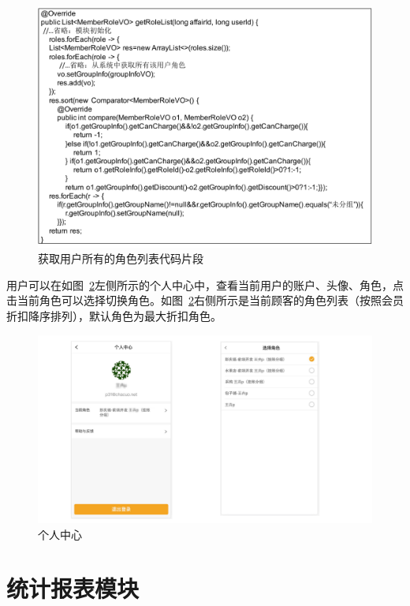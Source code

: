 \begin{figure}[htbp!]
    \centering
    \includegraphics[width=5.5in]{FIGs/chapter4/5.pdf}
    \caption{获取用户所有的角色列表代码片段}\label{fig_user_5}
\end{figure}

用户可以在如图~\ref{fig_user_role_view}左侧所示的个人中心中，查看当前用户的账户、头像、角色，点击当前角色可以选择切换角色。如图~\ref{fig_user_role_view}右侧所示是当前顾客的角色列表（按照会员折扣降序排列），默认角色为最大折扣角色。

\begin{figure}[htbp!]
    \centering
    \includegraphics[width=\linewidth]{FIGs/chapter4/user_role_view.pdf}
    \caption{个人中心}\label{fig_user_role_view}
\end{figure}

\section{统计报表模块}
